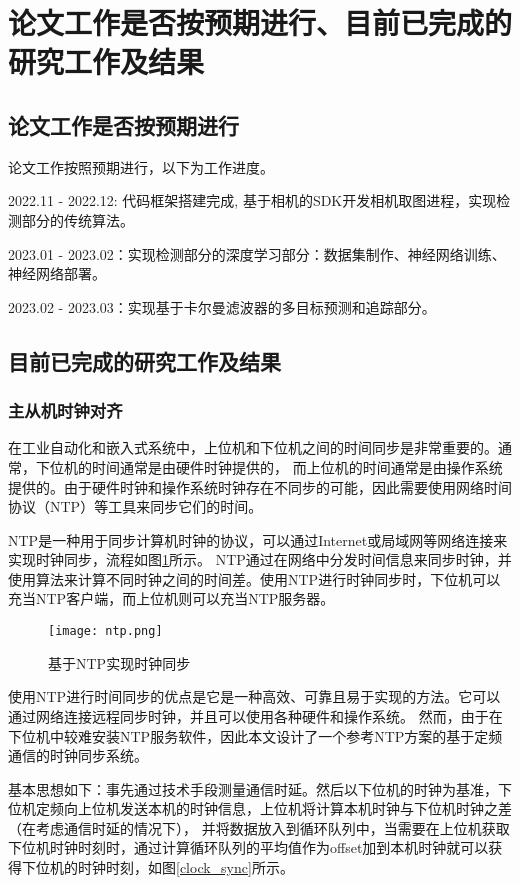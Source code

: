 \section{论文工作是否按预期进行、目前已完成的研究工作及结果}
\subsection{论文工作是否按预期进行}
论文工作按照预期进行，以下为工作进度。 \par
2022.11 - 2022.12: 代码框架搭建完成, 基于相机的SDK开发相机取图进程，实现检测部分的传统算法。\par
2023.01 - 2023.02：实现检测部分的深度学习部分：数据集制作、神经网络训练、神经网络部署。\par
2023.02 - 2023.03：实现基于卡尔曼滤波器的多目标预测和追踪部分。\par
\subsection{目前已完成的研究工作及结果}
\subsubsection{主从机时钟对齐 }
在工业自动化和嵌入式系统中，上位机和下位机之间的时间同步是非常重要的。通常，下位机的时间通常是由硬件时钟提供的，
而上位机的时间通常是由操作系统提供的。由于硬件时钟和操作系统时钟存在不同步的可能，因此需要使用网络时间协议（NTP）等工具来同步它们的时间。\par

NTP是一种用于同步计算机时钟的协议，可以通过Internet或局域网等网络连接来实现时钟同步，流程如图\ref{ntp}所示。
NTP通过在网络中分发时间信息来同步时钟，并使用算法来计算不同时钟之间的时间差。使用NTP进行时钟同步时，下位机可以充当NTP客户端，而上位机则可以充当NTP服务器。 \par
\begin{figure}[H]
    \centering
    \texttt{[image: ntp.png]} 
    \caption{基于NTP实现时钟同步} 
    \label{ntp}
\end{figure}


使用NTP进行时间同步的优点是它是一种高效、可靠且易于实现的方法。它可以通过网络连接远程同步时钟，并且可以使用各种硬件和操作系统。
然而，由于在下位机中较难安装NTP服务软件，因此本文设计了一个参考NTP方案的基于定频通信的时钟同步系统。\par

基本思想如下：事先通过技术手段测量通信时延。然后以下位机的时钟为基准，下位机定频向上位机发送本机的时钟信息，上位机将计算本机时钟与下位机时钟之差（在考虑通信时延的情况下），
并将数据放入到循环队列中，当需要在上位机获取下位机时钟时刻时，通过计算循环队列的平均值作为offset加到本机时钟就可以获得下位机的时钟时刻，如图\ref{clock_sync}所示。

